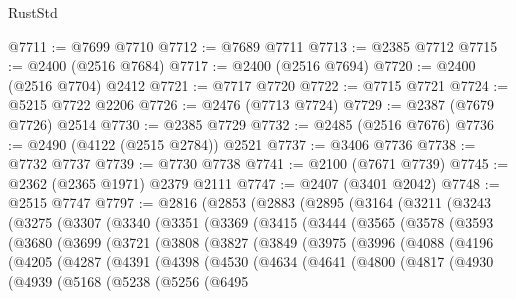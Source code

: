 \begin{lexlean}{RustStd}
\begin{coremodule}
{\begin{coremodule}
{{{{{{{{{{{{{{{{{{{{{{{{{{{{{{{{{{{{{{{{{{{{{{{{{{@7711 := @7699 @7710
@7712 := @7689 @7711
@7713 := @2385 @7712
@7715 := @2400 (@2516 @7684)
@7717 := @2400 (@2516 @7694)
@7720 := @2400 (@2516 @7704) @2412
@7721 := @7717 @7720
@7722 := @7715 @7721
@7724 := @5215 @7722 @2206
@7726 := @2476 (@7713 @7724)
@7729 := @2387 (@7679 @7726) @2514
@7730 := @2385 @7729
@7732 := @2485 (@2516 @7676)
@7736 := @2490 (@4122 (@2515 @2784)) @2521
@7737 := @3406 @7736
@7738 := @7732 @7737
@7739 := @7730 @7738
@7741 := @2100 (@7671 @7739)
@7745 := @2362 (@2365 @1971) @2379 @2111
@7747 := @2407 (@3401 @2042)
@7748 := @2515 @7747
@7797 := @2816
    (@2853
      (@2883
        (@2895
          (@3164
            (@3211
              (@3243
                (@3275
                  (@3307
                    (@3340
                      (@3351
                        (@3369
                          (@3415
                            (@3444
                              (@3565
                                (@3578
                                  (@3593
                                    (@3680
                                      (@3699
                                        (@3721
                                          (@3808
                                            (@3827
                                              (@3849
                                                (@3975
                                                  (@3996
                                                    (@4088
                                                      (@4196
                                                        (@4205
                                                          (@4287
                                                            (@4391
                                                              (@4398
                                                                (@4530
                                                                  (@4634
                                                                    (@4641
                                                                      (@4800
                                                                        (@4817
                                                                          (@4930
                                                                            (@4939
                                                                              (@5168
                                                                                (@5238
                                                                                  (@5256
                                                                                    (@6495
}}}}}}}}}}}}}}}}}}}}}}}}}}}}}}}}}}}}}}}}}}}}}}}}}}
\end{coremodule}}
\end{coremodule}
\end{lexlean}
